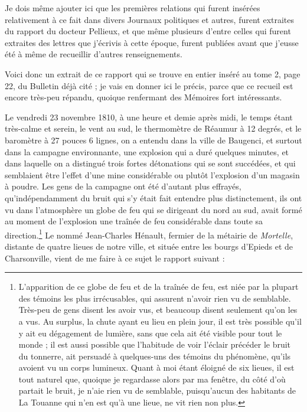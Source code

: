 \documentclass[a4paper, 12pt, oneside, french]{article}
\begin{document}
Je dois même ajouter ici que les premières relations qui furent insérées relativement à ce fait dans divers Journaux politiques et autres, furent extraites du rapport du docteur Pellieux, et que même plusieurs d'entre celles qui furent extraites des lettres que j'écrivis à cette époque, furent publiées avant que j'eusse été à même de recueillir d'autres renseignements.

Voici donc un extrait de ce rapport qui se trouve en entier inséré au tome 2, page 22, du Bulletin déjà cité ; je vais en donner ici le précis, parce que ce recueil est encore très-peu répandu, quoique renfermant des Mémoires fort intéressants.

\og Le vendredi 23 novembre 1810, à une heure et demie après midi, le temps étant très-calme et serein, le vent au sud, le thermomètre de Réaumur à 12 degrés, et le baromètre à 27 pouces 6 lignes, on a entendu dans la ville de Baugenci, et surtout dans la campagne environnante, une explosion qui a duré quelques minutes, et dans laquelle on a distingué trois fortes détonations qui se sont succédées, et qui semblaient être l'effet d'une mine considérable ou plutôt l'explosion d'un magasin à poudre. Les gens de la campagne ont été d'autant plus effrayés, qu'indépendamment du bruit qui s'y était fait entendre plus distinctement, ils ont vu dans l'atmosphère un globe de feu qui se dirigeant du nord au sud, avait formé au moment de l'explosion une traînée de feu considérable dans toute sa direction.\footnote{L'apparition de ce globe de feu et de la traînée de feu, est niée par la plupart des témoins les plus irrécusables, qui assurent n'avoir rien vu de semblable. Très-peu de gens disent les avoir vus, et beaucoup disent seulement qu'on les a vus. Au surplus, la chute ayant eu lieu en plein jour, il est très possible qu'il y ait eu dégagement de lumière, sans que cela ait été visible pour tout le monde ; il est aussi possible que l'habitude de voir l'éclair précéder le bruit du tonnerre, ait persuadé à quelques-uns des témoins du phénomène, qu'ils avoient vu un corps lumineux. Quant à moi étant éloigné de six lieues, il est tout naturel que, quoique je regardasse alors par ma fenêtre, du côté d'où partait le bruit, je n'aie rien vu de semblable, puisqu’aucun des habitants de La Touanne qui n'en est qu'à une lieue, ne vit rien non plus.} Le nommé Jean-Charles Hénault, fermier de la métairie de \emph{Mortelle}, distante de quatre lieues de notre ville, et située entre les bourgs d'Epieds et de Charsonville, vient de me faire à ce sujet le rapport suivant : \fg
\end{document}
